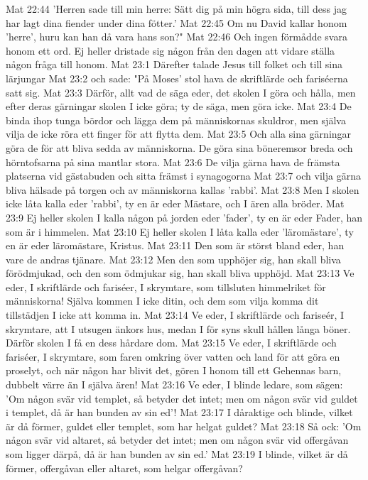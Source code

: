Mat 22:44  'Herren sade till min herre: Sätt dig på min högra sida, till dess jag har lagt dina fiender under dina fötter.'
Mat 22:45  Om nu David kallar honom 'herre', huru kan han då vara hans son?"
Mat 22:46  Och ingen förmådde svara honom ett ord. Ej heller dristade sig någon från den dagen att vidare ställa någon fråga till honom.
Mat 23:1  Därefter talade Jesus till folket och till sina lärjungar
Mat 23:2  och sade: "På Moses' stol hava de skriftlärde och fariséerna satt sig.
Mat 23:3  Därför, allt vad de säga eder, det skolen I göra och hålla, men efter deras gärningar skolen I icke göra; ty de säga, men göra icke.
Mat 23:4  De binda ihop tunga bördor och lägga dem på människornas skuldror, men själva vilja de icke röra ett finger för att flytta dem.
Mat 23:5  Och alla sina gärningar göra de för att bliva sedda av människorna. De göra sina böneremsor breda och hörntofsarna på sina mantlar stora.
Mat 23:6  De vilja gärna hava de främsta platserna vid gästabuden och sitta främst i synagogorna
Mat 23:7  och vilja gärna bliva hälsade på torgen och av människorna kallas 'rabbi'.
Mat 23:8  Men I skolen icke låta kalla eder 'rabbi', ty en är eder Mästare, och I ären alla bröder.
Mat 23:9  Ej heller skolen I kalla någon på jorden eder 'fader', ty en är eder Fader, han som är i himmelen.
Mat 23:10  Ej heller skolen I låta kalla eder 'läromästare', ty en är eder läromästare, Kristus.
Mat 23:11  Den som är störst bland eder, han vare de andras tjänare.
Mat 23:12  Men den som upphöjer sig, han skall bliva förödmjukad, och den som ödmjukar sig, han skall bliva upphöjd.
Mat 23:13  Ve eder, I skriftlärde och fariséer, I skrymtare, som tillsluten himmelriket för människorna! Själva kommen I icke ditin, och dem som vilja komma dit tillstädjen I icke att komma in.
Mat 23:14  Ve eder, I skriftlärde och fariseér, I skrymtare, att I utsugen änkors hus, medan I för syns skull hållen långa böner. Därför skolen I få en dess hårdare dom.
Mat 23:15  Ve eder, I skriftlärde och fariséer, I skrymtare, som faren omkring över vatten och land för att göra en proselyt, och när någon har blivit det, gören I honom till ett Gehennas barn, dubbelt värre än I själva ären!
Mat 23:16  Ve eder, I blinde ledare, som sägen: 'Om någon svär vid templet, så betyder det intet; men om någon svär vid guldet i templet, då är han bunden av sin ed'!
Mat 23:17  I dåraktige och blinde, vilket är då förmer, guldet eller templet, som har helgat guldet?
Mat 23:18  Så ock: 'Om någon svär vid altaret, så betyder det intet; men om någon svär vid offergåvan som ligger därpå, då är han bunden av sin ed.'
Mat 23:19  I blinde, vilket är då förmer, offergåvan eller altaret, som helgar offergåvan?
